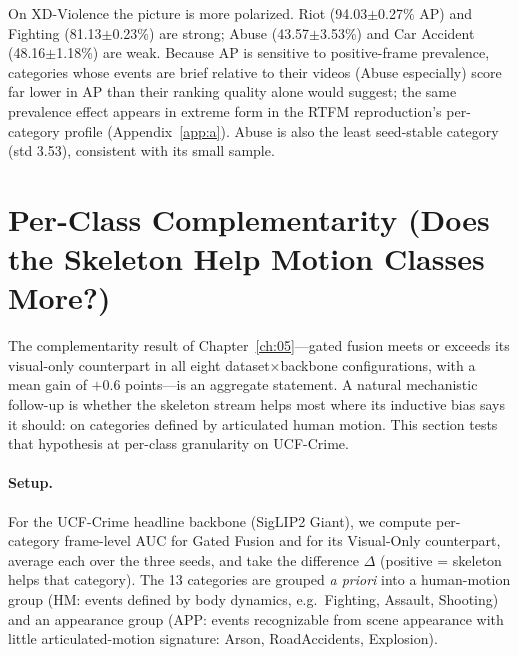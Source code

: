 On XD-Violence the picture is more polarized. Riot (94.03$\pm$0.27\% AP) and
Fighting (81.13$\pm$0.23\%) are strong; Abuse (43.57$\pm$3.53\%) and Car
Accident (48.16$\pm$1.18\%) are weak. Because AP is sensitive to
positive-frame prevalence, categories whose events are brief relative to
their videos (Abuse especially) score far lower in AP than their ranking
quality alone would suggest; the same prevalence effect appears in extreme
form in the RTFM reproduction's per-category profile
(Appendix~\ref{app:a}). Abuse is also the least seed-stable category
(std 3.53), consistent with its small sample.

\section{Per-Class Complementarity (Does the Skeleton Help Motion
Classes More?)}
\label{sec:appb-pri7}

The complementarity result of Chapter~\ref{ch:05}---gated fusion meets or
exceeds its visual-only counterpart in all eight dataset$\times$backbone
configurations, with a mean gain of $+0.6$ points---is an aggregate
statement. A natural mechanistic follow-up is whether the skeleton stream
helps most where its inductive bias says it should: on categories defined by
articulated human motion. This section tests that hypothesis at per-class
granularity on UCF-Crime.

\paragraph{Setup.} For the UCF-Crime headline backbone (SigLIP2 Giant), we
compute per-category frame-level AUC for Gated Fusion and for its
Visual-Only counterpart, average each over the three seeds, and take the
difference $\Delta$ (positive = skeleton helps that category). The 13
categories are grouped \emph{a priori} into a human-motion group (HM: events
defined by body dynamics, e.g.\ Fighting, Assault, Shooting) and an
appearance group (APP: events recognizable from scene appearance with little
articulated-motion signature: Arson, RoadAccidents, Explosion).

